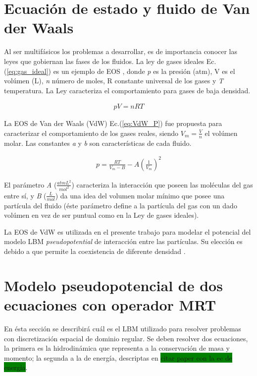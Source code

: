 \section{Ecuación de estado y fluido de Van der Waals}

Al ser multifásicos los problemas a desarrollar, es de importancia conocer las leyes que gobiernan las fases de los fluidos. La ley de gases ideales Ec. (\ref{eq:gas_ideal}) es un ejemplo de EOS , donde \textit{p} es la presión (atm), V es el volúmen (L), \textit{n} número de moles, R constante universal de los gases y \textit{T} temperatura. La Ley caracteriza el comportamiento para gases de baja densidad.

\begin{align}
p V = n R T
\label{eq:gas_ideal}
\end{align}

La EOS de Van der Waals (VdW) Ec.(\ref{eq:VdW_P}) fue propuesta para caracterizar el comportamiento de los gases reales, siendo $V_m = \frac{V}{n}$ el volúmen molar. Las constantes \textit{a} y \textit{b} son características de cada fluido.

\begin{align}
p = \frac{R T}{V_m - B} - A {\left(\frac{1}{V_m}\right)}^2
\label{eq:VdW_P}
\end{align}

El parámetro \textit{A}  ($\frac{atm L^2}{mol^2}$) caracteriza la interacción que poseen las moléculas del gas entre sí, y \textit{B} ($\frac{L}{mol}$) da una idea del volumen molar mínimo que posee una partícula del fluido (éste parámetro define a la partícula del gas con un dado volúmen en vez de ser puntual como en la Ley de gases ideales).

La EOS de VdW es utilizada en el presente trabajo para modelar el potencial del modelo LBM \textit{pseudopotential} de interacción entre las partículas. Su elección es debido a que permite la coexistencia de diferente densidad \cite{huang2015multiphase}. 


\section{Modelo pseudopotencial de dos ecuaciones con operador MRT}
\label{sec:LBM_2_ec_MRT}

En ésta sección se describirá cuál es el LBM utilizado para resolver problemas con discretización espacial de dominio regular. Se deben resolver dos ecuaciones, la primera es la hidrodinámica que representa a la conservación de masa y momento; la segunda a la de energía, descriptas en \colorbox{green}{citar paper con la ec de energia}.


